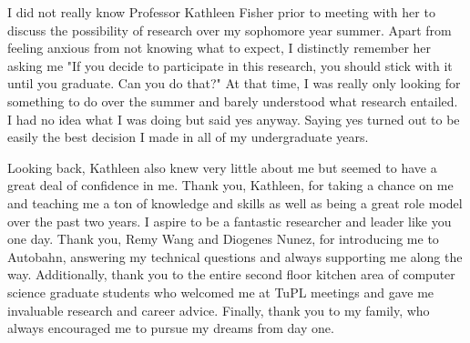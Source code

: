 \documentclass[
11pt, %
english, %
singlespacing, %
headsepline, %
]{MastersDoctoralThesis} %
\begin{document}

\begin{acknowledgements}
\addchaptertocentry{\acknowledgementname} %
I did not really know Professor Kathleen Fisher prior to meeting with her to discuss the possibility of research 
over my sophomore year summer.
Apart from feeling anxious from not knowing what to expect, I distinctly remember her
asking me "If you decide to participate in this research, you should stick with it until you
graduate. Can you do that?" At that time, I was really only looking for something to do over 
the summer and barely understood what research entailed. I had no idea what I was doing but said yes anyway. 
Saying yes turned out to be easily the best decision I made in all of my undergraduate years.

Looking back, Kathleen also knew very little about me but seemed to have a great deal of confidence
in me. Thank you, Kathleen, for taking a chance on me and teaching me a ton of knowledge and skills 
as well as being a great role model over the past two years. I aspire to be a fantastic researcher
and leader like you one day. Thank you, Remy Wang and Diogenes Nunez, for introducing me to Autobahn,
answering my technical questions and always supporting me along the way. Additionally, thank you to the entire
second floor kitchen area of computer science graduate students who welcomed me at TuPL meetings
and gave me invaluable research and career advice. Finally, thank you to my family, who 
always encouraged me to pursue my dreams from day one.
\end{acknowledgements}


\tableofcontents %

\listoffigures %

\listoftables %

\end{document}
